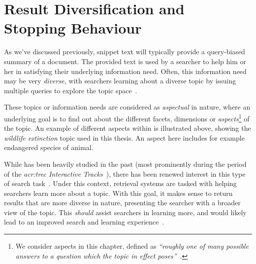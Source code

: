 
\chapter[Result Diversification and Stopping Behaviour]{Result Diversification and\\Stopping Behaviour}\label{chap:diversity}
As we've discussed previously, snippet text will typically provide a query-biased summary of a document. The provided text is used by a searcher to help him or her in satisfying their underlying information need. Often, this information need may be very \emph{diverse,} with searchers learning about a diverse topic by issuing multiple queries to explore the topic space~\citep{kelly2015search_tasks}.

\begin{figure}[h]
    \centering
    \vspace{4mm}
    \label{fig:aspectsintro}
    \vspace{-5mm}
\end{figure}

These topics or information needs are considered as \emph{aspectual} in nature, where an underlying goal is to find out about the different facets, dimensions or \emph{aspects}\footnote{We consider aspects in this chapter, defined as \emph{``roughly one of many possible answers to a question which the topic in effect poses''}~\citep{over1998trec}.} of the topic. An example of different aspects within is illustrated above, showing the \emph{wildlife extinction} topic used in this thesis. An aspect here includes for example endangered species of animal.

While  has been heavily studied in the past (most prominently during the period of the \emph{\gls{acr:trec} Interactive Tracks}~\citep{over2001trec}), there has been renewed interest in this type of search task~\citep{collins2017sal}. Under this context, retrieval systems are tasked with helping searchers learn more about a topic. With this goal, it makes sense to return results that are more diverse in nature, presenting the searcher with a broader view of the topic. This \emph{should} assist searchers in learning more, and would likely lead to an improved search and learning experience~\citep{syed2017sal}.

